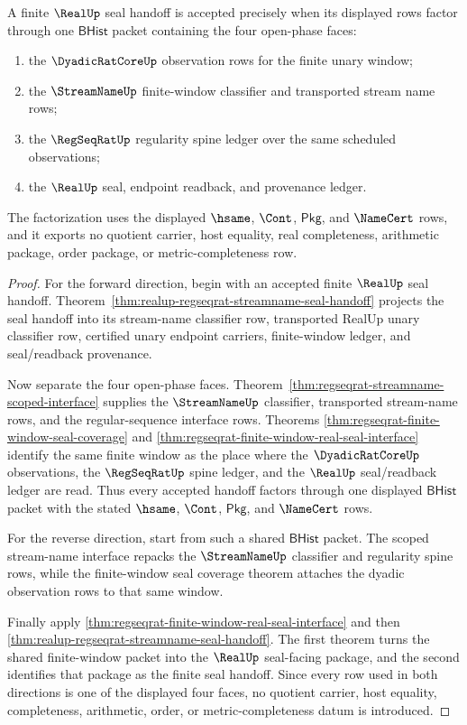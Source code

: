 \begin{theorem}
\label{thm:realup-open-phase-seal-exactness}
A finite $\RealUp$ seal handoff is accepted precisely when its displayed rows
factor through one $\mathsf{BHist}$ packet containing the four open-phase
faces:
\begin{enumerate}
  \item the $\DyadicRatCoreUp$ observation rows for the finite unary window;
  \item the $\StreamNameUp$ finite-window classifier and transported stream
  name rows;
  \item the $\RegSeqRatUp$ regularity spine ledger over the same scheduled
  observations;
  \item the $\RealUp$ seal, endpoint readback, and provenance ledger.
\end{enumerate}
The factorization uses the displayed $\hsame$, $\Cont$, $\mathsf{Pkg}$, and
$\NameCert$ rows, and it exports no quotient carrier, host equality, real
completeness, arithmetic package, order package, or metric-completeness row.
\end{theorem}
\begin{proof}
For the forward direction, begin with an accepted finite $\RealUp$ seal
handoff. Theorem~\ref{thm:realup-regseqrat-streamname-seal-handoff} projects
the seal handoff into its stream-name classifier row, transported RealUp unary
classifier row, certified unary endpoint carriers, finite-window ledger, and
seal/readback provenance.

Now separate the four open-phase faces. Theorem~\ref{thm:regseqrat-streamname-scoped-interface}
supplies the $\StreamNameUp$ classifier, transported stream-name rows, and the
regular-sequence interface rows. Theorems
\ref{thm:regseqrat-finite-window-seal-coverage} and
\ref{thm:regseqrat-finite-window-real-seal-interface} identify the same finite
window as the place where the $\DyadicRatCoreUp$ observations, the
$\RegSeqRatUp$ spine ledger, and the $\RealUp$ seal/readback ledger are read.
Thus every accepted handoff factors through one displayed $\mathsf{BHist}$
packet with the stated $\hsame$, $\Cont$, $\mathsf{Pkg}$, and $\NameCert$
rows.

For the reverse direction, start from such a shared $\mathsf{BHist}$ packet.
The scoped stream-name interface repacks the $\StreamNameUp$ classifier and
regularity spine rows, while the finite-window seal coverage theorem attaches
the dyadic observation rows to that same window.

Finally apply
\autoref{thm:regseqrat-finite-window-real-seal-interface} and then
\autoref{thm:realup-regseqrat-streamname-seal-handoff}. The first theorem
turns the shared finite-window packet into the $\RealUp$ seal-facing package,
and the second identifies that package as the finite seal handoff. Since every
row used in both directions is one of the displayed four faces, no quotient
carrier, host equality, completeness, arithmetic, order, or
metric-completeness datum is introduced.
\end{proof}

